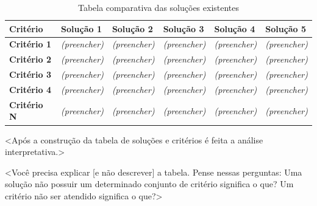 \begin{table}[htbp]
\centering
\caption{Tabela comparativa das soluções existentes}
\label{tab:comparativo-solucoes}
\renewcommand{\arraystretch}{1.2}
\begin{tabular}{|p{3.2cm}|p{2.2cm}|p{2.2cm}|p{2.2cm}|p{2.2cm}|p{2.2cm}|}
\hline
\textbf{Critério} & \textbf{Solução 1} & \textbf{Solução 2} & \textbf{Solução 3} & \textbf{Solução 4} & \textbf{Solução 5} \\
\hline
\textbf{Critério 1} & \textit{(preencher)} & \textit{(preencher)} & \textit{(preencher)} & \textit{(preencher)} & \textit{(preencher)} \\
\hline
\textbf{Critério 2} & \textit{(preencher)} & \textit{(preencher)} & \textit{(preencher)} & \textit{(preencher)} & \textit{(preencher)} \\
\hline
\textbf{Critério 3} & \textit{(preencher)} & \textit{(preencher)} & \textit{(preencher)} & \textit{(preencher)} & \textit{(preencher)} \\
\hline
\textbf{Critério 4} & \textit{(preencher)} & \textit{(preencher)} & \textit{(preencher)} & \textit{(preencher)} & \textit{(preencher)} \\
\hline
\textbf{Critério N} & \textit{(preencher)} & \textit{(preencher)} & \textit{(preencher)} & \textit{(preencher)} & \textit{(preencher)} \\
\hline
\end{tabular}
\end{table}

<Após a construção da tabela de soluções e critérios é feita a análise interpretativa.>

<Você precisa explicar [e não descrever] a tabela. Pense nessas perguntas: Uma solução não possuir um determinado conjunto de critério significa o que? Um critério não ser atendido significa o que?>